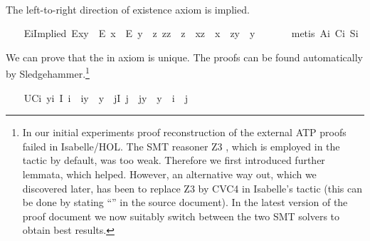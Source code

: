 \begin{isabellebody}
\isadelimproof
\ %
\endisadelimproof
%
\isatagproof
{}\isamarkupfalse%
%
\endisatagproof
{\isafoldproof}%
%
\isadelimproof
%
\endisadelimproof
%
\begin{isamarkuptext}%
The left-to-right direction of existence axiom  is implied.%
\end{isamarkuptext}\isamarkuptrue%
\ \ \isamarkupfalse%
\ E\isactrlsub iImplied{\isacharcolon}\ {\isachardoublequoteopen}E{\isacharparenleft}x{\isasymcdot}y{\isacharparenright}\ \isactrlbold {\isasymrightarrow}\ {\isacharparenleft}E\ x\ \isactrlbold {\isasymand}\ E\ y\ \isactrlbold {\isasymand}\ {\isacharparenleft}\isactrlbold {\isasymexists}z{\isachardot}\ z{\isasymcdot}z\ {\isasymcong}\ z\ \isactrlbold {\isasymand}\ x{\isasymcdot}z\ {\isasymcong}\ x\ \isactrlbold {\isasymand}\ z{\isasymcdot}y\ {\isasymcong}\ y{\isacharparenright}{\isacharparenright}{\isachardoublequoteclose}\ \isanewline
%
\isadelimproof
\ \ \ \ %
\endisadelimproof
%
\isatagproof
{}\isamarkupfalse%
\ {\isacharparenleft}metis\ A\isactrlsub i\ C\isactrlsub i\ S\isactrlsub i{\isacharparenright}%
\endisatagproof
{\isafoldproof}%
%
\isadelimproof
%
\endisadelimproof
%
\begin{isamarkuptext}%
We can prove that the  in axiom  is unique. The proofs can be 
   found automatically by Sledgehammer.\footnote{In our initial experiments proof reconstruction of the
   external ATP proofs failed in Isabelle/HOL. The SMT reasoner Z3 \cite{Z3}, which is employed
   in the  tactic by default, was too weak. Therefore we first introduced further lemmata, 
   which helped. 
   However, an alternative way out, which we discovered later, has been to replace Z3 by CVC4 \cite{CVC4} 
   in Isabelle's  
   tactic (this can be done by stating ``'' in the source document).
   In the latest version of the proof document we now suitably switch between the two SMT solvers to obtain best results.}%
\end{isamarkuptext}\isamarkuptrue%
\ \ \isamarkupfalse%
\ UC\isactrlsub i{\isacharcolon}\ {\isachardoublequoteopen}\isactrlbold {\isasymforall}y{\isachardot}\isactrlbold {\isasymexists}i{\isachardot}\ I\ i\ \isactrlbold {\isasymand}\ i{\isasymcdot}y\ {\isasymcong}\ y\ \isactrlbold {\isasymand}\ {\isacharparenleft}\isactrlbold {\isasymforall}j{\isachardot}{\isacharparenleft}I\ j\ \isactrlbold {\isasymand}\ j{\isasymcdot}y\ {\isasymcong}\ y{\isacharparenright}\ \isactrlbold {\isasymrightarrow}\ i\ {\isasymcong}\ j{\isacharparenright}{\isachardoublequoteclose}\ \isanewline

\end{isabellebody}
